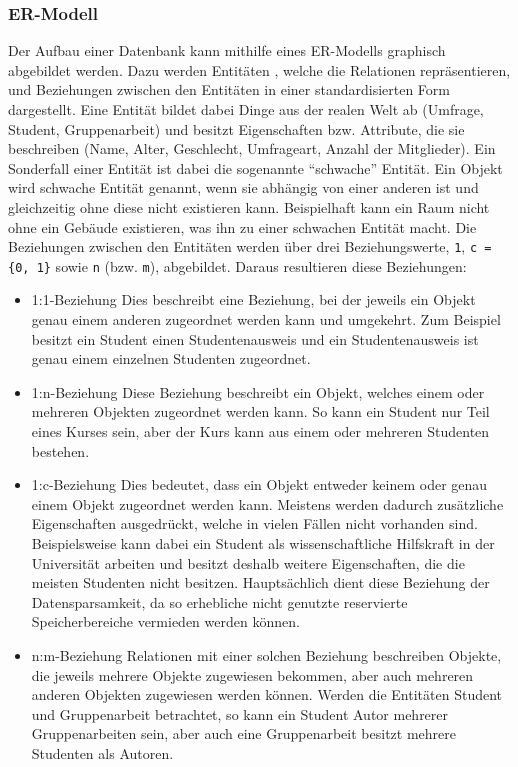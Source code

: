 \subsubsection{\acl{ER-Modell}}
Der Aufbau einer Datenbank kann mithilfe eines \acs{ER-Modell}s graphisch abgebildet werden. 
Dazu werden Entitäten , welche die Relationen repräsentieren, und Beziehungen  zwischen den Entitäten in einer standardisierten Form dargestellt.
Eine Entität bildet dabei Dinge aus der realen Welt ab (Umfrage, Student, Gruppenarbeit) und besitzt Eigenschaften bzw. Attribute, die sie beschreiben (Name, Alter, Geschlecht, Umfrageart, Anzahl der Mitglieder).
Ein Sonderfall einer Entität ist dabei die sogenannte \enquote{schwache} Entität.
Ein Objekt wird schwache Entität genannt, wenn sie abhängig von einer anderen ist und gleichzeitig ohne diese nicht existieren kann.
Beispielhaft kann ein Raum nicht ohne ein Gebäude existieren, was ihn zu einer schwachen Entität macht. 
Die Beziehungen zwischen den Entitäten werden über drei Beziehungswerte, \texttt{1}, \texttt{c = \{0, 1\}} sowie \texttt{n} (bzw. \texttt{m}), abgebildet.
Daraus resultieren diese Beziehungen:

\begin{itemize}
    \item 1:1-Beziehung \newline
    Dies beschreibt eine Beziehung, bei der jeweils ein Objekt genau einem anderen zugeordnet werden kann und umgekehrt.
    Zum Beispiel besitzt ein Student einen Studentenausweis und ein Studentenausweis ist genau einem einzelnen Studenten zugeordnet.
    \item 1:n-Beziehung \newline
    Diese Beziehung beschreibt ein Objekt, welches einem oder mehreren Objekten zugeordnet werden kann.
    So kann ein Student nur Teil eines Kurses sein, aber der Kurs kann aus einem oder mehreren Studenten bestehen.
    \item 1:c-Beziehung \newline
    Dies bedeutet, dass ein Objekt entweder keinem oder genau einem Objekt zugeordnet werden kann.
    Meistens werden dadurch zusätzliche Eigenschaften ausgedrückt, welche in vielen Fällen nicht vorhanden sind.
	Beispielsweise kann dabei ein Student als wissenschaftliche Hilfskraft in der Universität arbeiten und besitzt deshalb weitere Eigenschaften, die die meisten Studenten nicht besitzen.
	Hauptsächlich dient diese Beziehung der Datensparsamkeit, da so erhebliche nicht genutzte reservierte Speicherbereiche vermieden werden können.
    \item n:m-Beziehung \newline
    Relationen mit einer solchen Beziehung beschreiben Objekte, die jeweils mehrere Objekte zugewiesen bekommen, aber auch mehreren anderen Objekten zugewiesen werden können.
    Werden die Entitäten Student und Gruppenarbeit betrachtet, so kann ein Student Autor mehrerer Gruppenarbeiten sein, aber auch eine Gruppenarbeit besitzt mehrere Studenten als Autoren.
\end{itemize}

